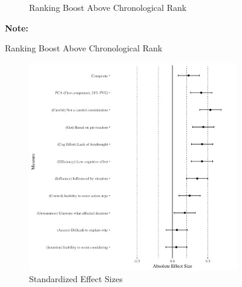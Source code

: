 \documentclass[12pt,letterpaper]{article}
\begin{document}
\begin{figure}[ht]
\begin{subfigure}{.5\textwidth}
        \caption{Ranking Boost Above Chronological Rank}
        \label{fig:pymk_rankingboost}
    \end{subfigure}
\footnotesize \textbf{Note:} 
\end{figure}


\begin{figure}
\caption{Deliberateness}
  \begin{subfigure}{.5\textwidth} 
        \centering
        \includegraphics[width=1\linewidth, angle=270]{Output/Graphs/Experiments/Automaticity/standardized effect sizes.jpg} 
        \caption{Standardized Effect Sizes}
        \label{fig:auto_effsize}
    \end{subfigure}
    \begin{subfigure}{.5\textwidth} 
        \centering

\end{subfigure}
\end{figure}
\end{document}
